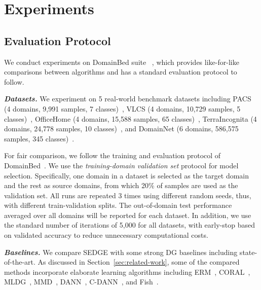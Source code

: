 \documentclass{article}
\newcommand{\method}{\textsc{SEDGE}\xspace}
\begin{document}
\section{Experiments}

\subsection{Evaluation Protocol} 

We conduct experiments on DomainBed suite ~\citep{gulrajani2020search}, which provides like-for-like comparisons between algorithms and has a standard evaluation protocol to follow.

\textbf{\textit{Datasets.}} 
We experiment on 5 real-world benchmark datasets including
PACS (4 domains, 9,991 samples, 7 classes)~\citep{li2017deeper}, VLCS (4 domains, 10,729 samples, 5 classes)~\citep{fang2013unbiased}, OfficeHome (4 domains, 15,588 samples, 65 classes)~\citep{venkateswara2017deep}, TerraIncognita (4 domains, 24,778 samples, 10 classes)~\citep{beery2018recognition}, and DomainNet (6 domains, 586,575 samples, 345 classes)~\citep{peng2019moment}. 

For fair comparison,
we follow the training and evaluation protocol of DomainBed~\citep{gulrajani2020search}. 
We use the \textit{training-domain validation set} protocol for model selection. 
Specifically, one domain in a dataset is selected as the target domain and the rest as source domains, from which 20\% of samples are used as the validation set. 
All runs are repeated 3 times using different random seeds, thus, with different train-validation splits.
The out-of-domain test performance averaged over all domains will be reported for each dataset.
In addition, we use the standard number of iterations of 5,000 for all datasets, with early-stop based on validated accuracy to reduce unnecessary computational costs.



\textbf{\textit{Baselines.}} 
We compare \method with some strong DG baselines including state-of-the-art.
As discussed in Section~\ref{sec:related-work}, some of the compared methods incorporate elaborate learning algorithms including
ERM~\citep{vapnick1998statistical}, CORAL~\citep{sun2016deep}, MLDG~\citep{li2018learning}, MMD~\citep{li2018domain}, DANN~\citep{ganin2016domain}, C-DANN~\citep{li2018deep}, and Fish~\citep{shi2021gradient}.
\end{document}
